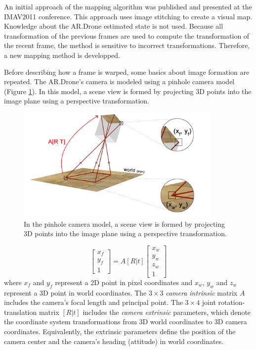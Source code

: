 An initial approach of the mapping algorithm was published \cite{visser2011closing} and presented at the IMAV2011 conference.
This approach uses image stitching \cite{levin2004seamless} to create a visual map.
Knowledge about the AR.Drone estimated state is not used.
Because all transformation of the previous frames are used to compute the transformation of the recent frame, the method is sensitive to incorrect transformations.
Therefore, a new mapping method is developped.

Before describing how a frame is warped, some basics about image formation are repeated. %
The AR.Drone's camera is modeled using a pinhole camera model (Figure \ref{fig:mapping1}).
In this model, a scene view is formed by projecting 3D points into the image plane using a perspective transformation.

\begin{figure}[htb]
\centering
\includegraphics[width=10cm]{images/mapping0.png}
\caption{In the pinhole camera model, a scene view is formed by projecting 3D points into the image plane using a perspective transformation.}
\label{fig:mapping1}
\end{figure}

\begin{equation}
\left[ {
\begin{array}{c} x_f \\ y_f \\ 1 \end{array}
} \right]
= A[R|t]
\left[ {
\begin{array}{c} x_w \\ y_w \\ z_w \\ 1 \end{array}
} \right]
\end{equation}
where $x_f$ and $y_f$ represent a 2D point in pixel coordinates and $x_w$, $y_w$ and $z_w$ represent a 3D point in world coordinates.
The $3 \times 3$ \textit{camera intrinsic} matrix $A$ includes the camera's focal length and principal point.
The $3 \times 4$ joint rotation-translation matrix $[R|t]$ includes the \textit{camera extrinsic} parameters, which denote the coordinate system transformations from 3D world coordinates to 3D camera coordinates. Equivalently, the extrinsic parameters define the position of the camera center and the camera's heading (attitude) in world coordinates.

